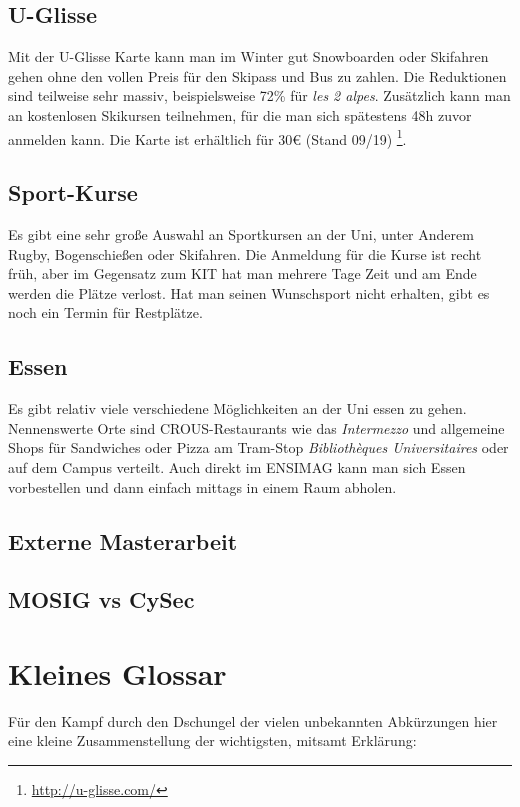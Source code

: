 \documentclass[11pt,a4paper]{article}
\begin{document}
  \subsection{U-Glisse}
  Mit der U-Glisse Karte kann man im Winter gut Snowboarden oder Skifahren gehen ohne den vollen Preis für den Skipass und Bus zu zahlen. Die Reduktionen sind teilweise sehr massiv, beispielsweise 72\% für \textit{les 2 alpes}. Zusätzlich kann man an kostenlosen Skikursen teilnehmen, für die man sich spätestens 48h zuvor anmelden kann.
  Die Karte ist erhältlich für 30€ (Stand 09/19) \footnote{\url{http://u-glisse.com/}}.
  \subsection{Sport-Kurse}
  Es gibt eine sehr große Auswahl an Sportkursen an der Uni, unter Anderem Rugby, Bogenschießen oder Skifahren. Die Anmeldung für die Kurse ist recht früh, aber im Gegensatz zum KIT hat man mehrere Tage Zeit und am Ende werden die Plätze verlost. Hat man seinen Wunschsport nicht erhalten, gibt es noch ein Termin für Restplätze.

  \subsection{Essen}
  Es gibt relativ viele verschiedene Möglichkeiten an der Uni essen zu gehen. Nennenswerte Orte sind CROUS-Restaurants wie das \textit{Intermezzo} und allgemeine Shops für Sandwiches oder Pizza am Tram-Stop \textit{Bibliothèques Universitaires} oder auf dem Campus verteilt. Auch direkt im ENSIMAG kann man sich Essen vorbestellen und dann einfach mittags in einem Raum abholen.

  \subsection{Externe Masterarbeit}

  \subsection{MOSIG vs CySec}

	
	\newpage
	\section{Kleines Glossar}
	
	Für den Kampf durch den Dschungel der vielen unbekannten Abkürzungen hier eine kleine Zusammenstellung der wichtigsten, mitsamt Erklärung:\\
	
\end{document}
